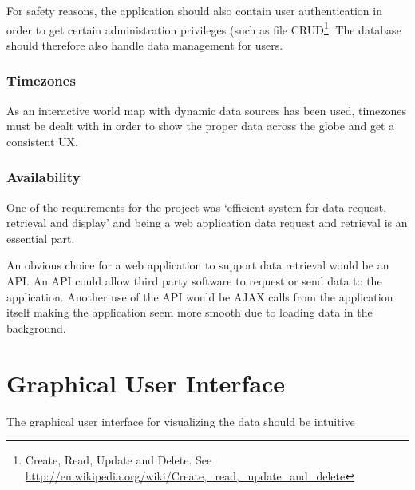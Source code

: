 For safety reasons, the application should also contain user authentication in order to get certain administration privileges (such as file CRUD\footnote{Create, Read, Update and Delete. See \url{http://en.wikipedia.org/wiki/Create,_read,_update_and_delete}}. The database should therefore also handle data management for users.

\subsubsection{Timezones}
\label{sec:timezones}
As an interactive world map with dynamic data sources has been used, timezones must be dealt with in order to show the proper data across the globe and get a consistent UX.

\subsubsection{Availability}
\label{sec:availability}
One of the requirements for the project was `efficient system for data request, retrieval and display' and being a web application data request and retrieval is an essential part.

An obvious choice for a web application to support data retrieval would be an API. An API could allow third party software to request or send data to the application. Another use of the API would be AJAX calls from the application itself making the application seem more smooth due to loading data in the background.

\section{Graphical User Interface}
\label{sec:graphical_user_interface}
The graphical user interface for visualizing the data should be intuitive
